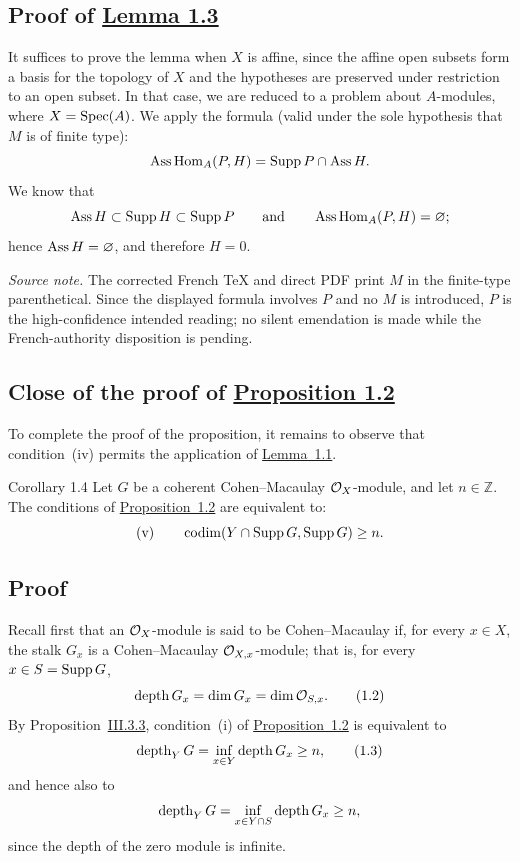\subsection*{Proof of \hyperref[VII.1.3]{Lemma 1.3}}
It suffices to prove the lemma when $X$ is affine, since the affine open
subsets form a basis for the topology of $X$ and the hypotheses are preserved
under restriction to an open subset. In that case, we are reduced to a problem
about $A$-modules, where $X=\operatorname{Spec}(A)$. We apply the formula (valid under the
sole hypothesis that $M$ is of finite type):
\[
  \operatorname{Ass}\operatorname{Hom}_A(P,H)=\operatorname{Supp} P\cap\operatorname{Ass} H.
\]
We know that
\[
  \operatorname{Ass} H\subset\operatorname{Supp} H\subset\operatorname{Supp} P
  \qquad\text{and}\qquad
  \operatorname{Ass}\operatorname{Hom}_A(P,H)=\varnothing;
\]
hence $\operatorname{Ass} H=\varnothing$, and therefore $H=0$.

\noindent\textit{Source note.} The corrected French TeX and direct PDF print
$M$ in the finite-type parenthetical. Since the displayed formula involves
$P$ and no $M$ is introduced, $P$ is the high-confidence intended reading;
no silent emendation is made while the French-authority disposition is pending.

\subsection*{Close of the proof of \hyperref[VII.1.2]{Proposition 1.2}}
To complete the proof of the proposition, it remains to observe that
condition~(iv) permits the application of \hyperref[VII.1.1]{Lemma~1.1}.

\begin{sgastatement}{Corollary 1.4}
Let $G$ be a coherent Cohen--Macaulay $\mathcal O_X$-module, and let $n\in\mathbb Z$.
The conditions of \hyperref[VII.1.2]{Proposition~1.2} are equivalent to:
\[
  \textup{(v)}\qquad
  \operatorname{codim}(Y\cap\operatorname{Supp} G,\operatorname{Supp} G)\geq n.
\]
\end{sgastatement}

\subsection*{Proof}
Recall first that an $\mathcal O_X$-module is said to be Cohen--Macaulay if, for every
$x\in X$, the stalk $G_x$ is a Cohen--Macaulay $\mathcal O_{X,x}$-module; that is,
for every $x\in S=\operatorname{Supp} G$,
\begin{equation}
  \operatorname{depth} G_x=\dim G_x=\dim\mathcal O_{S,x}.
  \tag{1.2}\label{eq:VII.1.2}
\end{equation}
By Proposition~\hyperref[III.3.3]{III.3.3}, condition~(i) of \hyperref[VII.1.2]{Proposition~1.2} is equivalent to
\begin{equation}
  \operatorname{depth}_Y G=\inf_{x\in Y}\operatorname{depth} G_x\geq n,
  \tag{1.3}\label{eq:VII.1.3}
\end{equation}
and hence also to
\[
  \operatorname{depth}_Y G=\inf_{x\in Y\cap S}\operatorname{depth} G_x\geq n,
\]
since the depth of the zero module is infinite.

